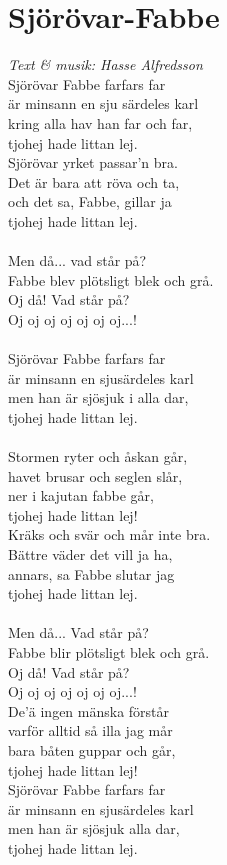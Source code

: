 \section{Sjörövar-Fabbe}
\textit{Text \& musik: Hasse Alfredsson}
\vspace{2mm}\\
Sjörövar Fabbe farfars far\\
är minsann en sju särdeles karl\\
kring alla hav han far och far,\\
tjohej hade littan lej.\\
Sjörövar yrket passar'n bra.\\
Det är bara att röva och ta,\\
och det sa, Fabbe, gillar ja\\
tjohej hade littan lej.\\
\\
Men då... vad står på?\\
Fabbe blev plötsligt blek och grå.\\
Oj då! Vad står på?\\
Oj oj oj oj oj oj oj...!\\
\\
Sjörövar Fabbe farfars far\\
är minsann en sjusärdeles karl\\
men han är sjösjuk i alla dar,\\
tjohej hade littan lej.\\
\\
Stormen ryter och åskan går,\\
havet brusar och seglen slår,\\
ner i kajutan fabbe går,\\
tjohej hade littan lej!\\
Kräks och svär och mår inte bra.\\
Bättre väder det vill ja ha,\\
annars, sa Fabbe slutar jag\\
tjohej hade littan lej.\\
\\
Men då... Vad står på?\\
Fabbe blir plötsligt blek och grå.\\
Oj då! Vad står på?\\
Oj oj oj oj oj oj oj...!\\
De'ä ingen mänska förstår\\
varför alltid så illa jag mår\\
bara båten guppar och går,\\
tjohej hade littan lej!\\
Sjörövar Fabbe farfars far\\
är minsann en sjusärdeles karl\\
men han är sjösjuk alla dar,\\
tjohej hade littan lej.\\

